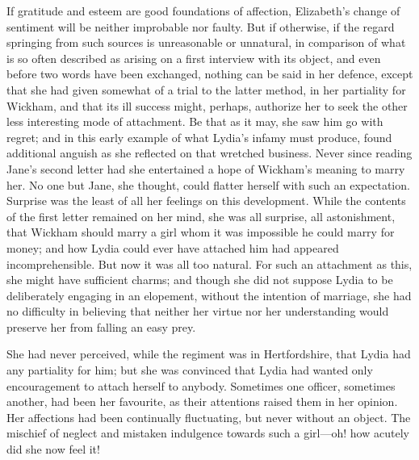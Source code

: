 If gratitude and esteem are good foundations of affection, Elizabeth's change of sentiment will be neither improbable nor faulty. But if otherwise, if the regard springing from such sources is unreasonable or unnatural, in comparison of what is so often described as arising on a first interview with its object, and even before two words have been exchanged, nothing can be said in her defence, except that she had given somewhat of a trial to the latter method, in her partiality for Wickham, and that its ill success might, perhaps, authorize her to seek the other less interesting mode of attachment. Be that as it may, she saw him go with regret; and in this early example of what Lydia's infamy must produce, found additional anguish as she reflected on that wretched business. Never since reading Jane's second letter had she entertained a hope of Wickham's meaning to marry her. No one but Jane, she thought, could flatter herself with such an expectation. Surprise was the least of all her feelings on this development. While the contents of the first letter remained on her mind, she was all surprise, all astonishment, that Wickham should marry a girl whom it was impossible he could marry for money; and how Lydia could ever have attached him had appeared incomprehensible. But now it was all too natural. For such an attachment as this, she might have sufficient charms; and though she did not suppose Lydia to be deliberately engaging in an elopement, without the intention of marriage, she had no difficulty in believing that neither her virtue nor her understanding would preserve her from falling an easy prey.

She had never perceived, while the regiment was in Hertfordshire, that Lydia had any partiality for him; but she was convinced that Lydia had wanted only encouragement to attach herself to anybody. Sometimes one officer, sometimes another, had been her favourite, as their attentions raised them in her opinion. Her affections had been continually fluctuating, but never without an object. The mischief of neglect and mistaken indulgence towards such a girl—oh! how acutely did she now feel it!

